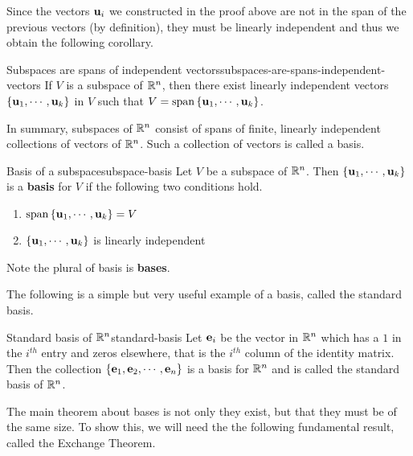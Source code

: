 Since the vectors $\mbox{\bf u}_i$ we constructed in the proof above are
not in the span of the previous vectors (by definition), they must be
linearly independent and thus we obtain the following corollary.

\begin{corollary}{Subspaces are spans of independent vectors}{subspaces-are-spans-independent-vectors}
  If $V$ is a subspace of $\mathbb{R}^{n}$, then there exist linearly
  independent vectors $\left\{\mbox{\bf u}_{1},\cdots ,\mbox{\bf u}_{k}\right\}$ in $V$
  such that $V=\sspan\set{\vect{u}_{1},\cdots ,\vect{u}_{k}}$.
\end{corollary}

In summary, subspaces of $\mathbb{R}^{n}$ consist of spans of finite, linearly
independent collections of vectors of $\mathbb{R}^{n}$.  Such a collection of
vectors is called a basis.

\begin{definition}{Basis of a subspace}{subspace-basis}
  Let $V$ be a subspace of $\mathbb{R}^{n}$. Then
  $\left\{ \mbox{\bf u}_{1},\cdots ,\mbox{\bf u}_{k}\right\} $ is a \textbf{basis} for
  $V$ if the following two conditions
  hold.

  \begin{enumerate}
  \item $\sspan\set{\vect{u}_{1},\cdots ,\vect{u}_{k}} =V$
  \item $\left\{\mbox{\bf u}_{1},\cdots ,\mbox{\bf u}_{k}\right\} $ is linearly
    independent
  \end{enumerate}

  Note the plural of basis is \textbf{bases}. 
\end{definition}

The following is a simple but very useful example of a basis, called
the standard basis.

\begin{definition}{Standard basis of $\mathbb{R}^n$}{standard-basis}
  Let $\mbox{\bf e}_i$ be the vector in $\mathbb{R}^n$ which has a $1$ in the
  $i^{th}$ entry and zeros elsewhere, that is the $i^{th}$ column of
  the identity matrix. Then the collection
  $\left\{\mbox{\bf e}_1, \mbox{\bf e}_2, \cdots, \mbox{\bf e}_n \right\}$ is a basis for
  $\mathbb{R}^n$ and is called the standard basis of
  $\mathbb{R}^n$.
\end{definition}

The main theorem about bases is not only they exist, but that they
must be of the same size. To show this, we will need the the following
fundamental result, called the Exchange Theorem.

